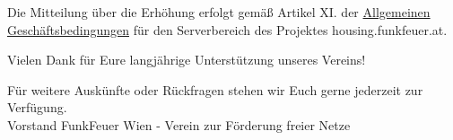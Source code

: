 \documentclass[parskip=half]{scrreprt}
\begin{document}
\vspace{0.5cm}

Die Mitteilung über die Erhöhung erfolgt gemäß Artikel XI. der \href{https://housing.funkfeuer.at/files/AGB.pdf}{Allgemeinen Geschäftsbedingungen} für den Serverbereich des Projektes housing.funkfeuer.at.

Vielen Dank für Eure langjährige Unterstützung unseres Vereins!

Für weitere Auskünfte oder Rückfragen stehen wir Euch gerne jederzeit zur Verfügung. \\

Vorstand FunkFeuer Wien - Verein zur Förderung freier Netze
\end{document}
